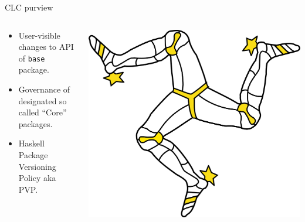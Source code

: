 \documentclass[handout]{beamer}
\begin{document}
\begin{frame}{CLC purview}

\begin{columns}[T]
  \begin{column}{.47\textwidth}

\begin{itemize}[<+->]
\bigskip
\item User-visible changes to API of {\tt base} package.
\bigskip
\item Governance of designated so called ``Core'' packages.
\bigskip
\item Haskell Package Versioning Policy aka PVP.
\end{itemize}

\end{column}

\begin{column}{.53\textwidth}
  \includegraphics[width=\textwidth]{triskelion.png}
\end{column}

\end{columns}

\end{frame}
\end{document}
